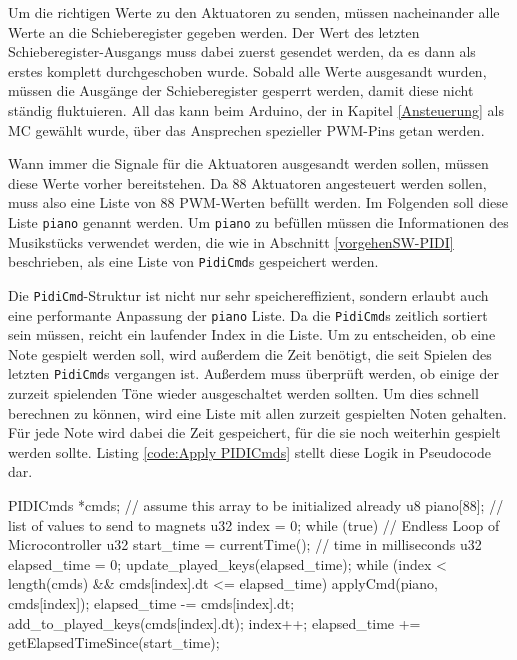 Um die richtigen Werte zu den Aktuatoren zu senden, müssen nacheinander alle Werte an die Schieberegister gegeben werden.
Der Wert des letzten Schieberegister-Ausgangs muss dabei zuerst gesendet werden, da es dann als erstes komplett durchgeschoben wurde.
Sobald alle Werte ausgesandt wurden, müssen die Ausgänge der Schieberegister gesperrt werden, damit diese nicht ständig fluktuieren.
All das kann beim Arduino, der in Kapitel \ref{Ansteuerung} als \ac{MC} gewählt wurde, über das Ansprechen spezieller \ac{PWM}-Pins getan werden.

Wann immer die Signale für die Aktuatoren ausgesandt werden sollen, müssen diese Werte vorher bereitstehen.
Da 88 Aktuatoren angesteuert werden sollen, muss also eine Liste von 88 \ac{PWM}-Werten befüllt werden.
Im Folgenden soll diese Liste \lstinline{piano} genannt werden.
Um \lstinline{piano} zu befüllen müssen die Informationen des Musikstücks verwendet werden, die wie in Abschnitt \ref{vorgehenSW-PIDI} beschrieben, als eine Liste von \lstinline{PidiCmd}s gespeichert werden.

Die \lstinline{PidiCmd}-Struktur ist nicht nur sehr speichereffizient, sondern erlaubt auch eine performante Anpassung der \lstinline{piano} Liste.
Da die \lstinline{PidiCmd}s zeitlich sortiert sein müssen, reicht ein laufender Index in die Liste.
Um zu entscheiden, ob eine Note gespielt werden soll, wird außerdem die Zeit benötigt, die seit Spielen des letzten \lstinline{PidiCmd}s vergangen ist.
Außerdem muss überprüft werden, ob einige der zurzeit spielenden Töne wieder ausgeschaltet werden sollten.
Um dies schnell berechnen zu können, wird eine Liste mit allen zurzeit gespielten Noten gehalten.
Für jede Note wird dabei die Zeit gespeichert, für die sie noch weiterhin gespielt werden sollte.
Listing \ref{code:Apply PIDICmds} stellt diese Logik in Pseudocode dar.

\begin{UnbrokenCodePage}[style=CStyle, caption={Nutzung der \lstinline{PidiCmd}-Struktur}, label={code:Apply PIDICmds}]
PIDICmds *cmds; // assume this array to be initialized already
u8  piano[88];  // list of values to send to magnets
u32 index = 0;
while (true) {  // Endless Loop of Microcontroller
    u32 start_time   = currentTime(); // time in milliseconds
    u32 elapsed_time = 0;
    update_played_keys(elapsed_time);
    while (index < length(cmds) && cmds[index].dt <= elapsed_time) {
        applyCmd(piano, cmds[index]);
        elapsed_time -= cmds[index].dt;
        add_to_played_keys(cmds[index].dt);
        index++;
    }
    elapsed_time += getElapsedTimeSince(start_time);
}
\end{UnbrokenCodePage}

